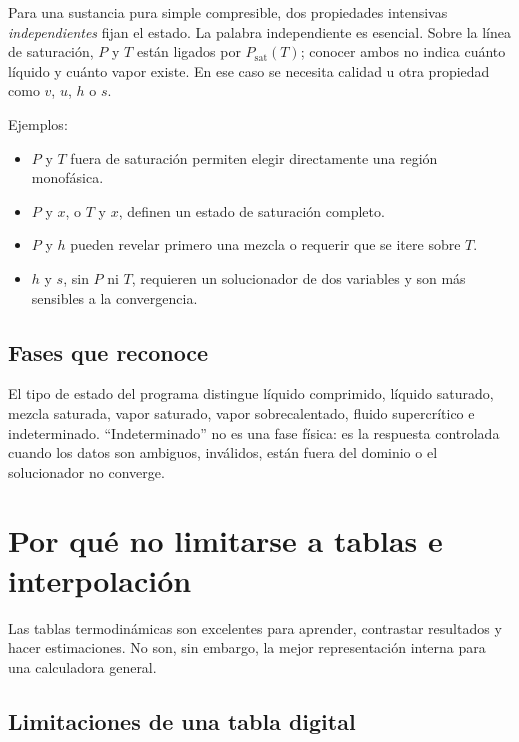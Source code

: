 \documentclass[11pt,a4paper,oneside]{article}
\begin{document}
Para una sustancia pura simple compresible, dos propiedades intensivas \emph{independientes} fijan el estado. La palabra independiente es esencial. Sobre la l\'inea de saturaci\'on, $P$ y $T$ est\'an ligados por $P_{\mathrm{sat}}(T)$; conocer ambos no indica cu\'anto l\'iquido y cu\'anto vapor existe. En ese caso se necesita calidad u otra propiedad como $v$, $u$, $h$ o $s$.

Ejemplos:

\begin{itemize}
  \item $P$ y $T$ fuera de saturaci\'on permiten elegir directamente una regi\'on monof\'asica.
  \item $P$ y $x$, o $T$ y $x$, definen un estado de saturaci\'on completo.
  \item $P$ y $h$ pueden revelar primero una mezcla o requerir que se itere sobre $T$.
  \item $h$ y $s$, sin $P$ ni $T$, requieren un solucionador de dos variables y son m\'as sensibles a la convergencia.
\end{itemize}

\subsection{Fases que reconoce}

El tipo de estado del programa distingue l\'iquido comprimido, l\'iquido saturado, mezcla saturada, vapor saturado, vapor sobrecalentado, fluido supercr\'itico e indeterminado. ``Indeterminado'' no es una fase f\'isica: es la respuesta controlada cuando los datos son ambiguos, inv\'alidos, est\'an fuera del dominio o el solucionador no converge.

\section{Por qu\'e no limitarse a tablas e interpolaci\'on}

Las tablas termodin\'amicas son excelentes para aprender, contrastar resultados y hacer estimaciones. No son, sin embargo, la mejor representaci\'on interna para una calculadora general.

\subsection{Limitaciones de una tabla digital}
\end{document}
